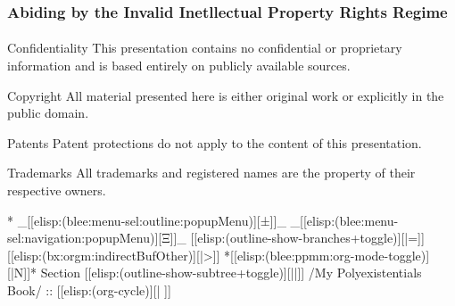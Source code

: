 \begin{verblatex}

\begin{frame}[fragile,plain,label=abidingIpr]
    \frametitle{Abiding by the Invalid Inetllectual Property Rights Regime}
    \framesubtitle{}


    \begin{block}{Confidentiality}
      This presentation contains no confidential or proprietary information and is based entirely on publicly available sources.
    \end{block}

    \begin{alertblock}{Copyright}
      All material presented here is either original work or explicitly in the public domain.
    \end{alertblock}

    \begin{exampleblock}{Patents}
      Patent protections do not apply to the content of this presentation.
    \end{exampleblock}

    \begin{block}{Trademarks}
      All trademarks and registered names are the property of their respective owners.
    \end{block}


\end{frame}
\end{verblatex}



\begin{whenOrg}
*  _[[elisp:(blee:menu-sel:outline:popupMenu)][±]]_ _[[elisp:(blee:menu-sel:navigation:popupMenu)][Ξ]]_ [[elisp:(outline-show-branches+toggle)][|=]] [[elisp:(bx:orgm:indirectBufOther)][|>]] *[[elisp:(blee:ppmm:org-mode-toggle)][|N]]*  Section    [[elisp:(outline-show-subtree+toggle)][||]]   /My Polyexistentials Book/ ::  [[elisp:(org-cycle)][| ]]
\end{whenOrg}

